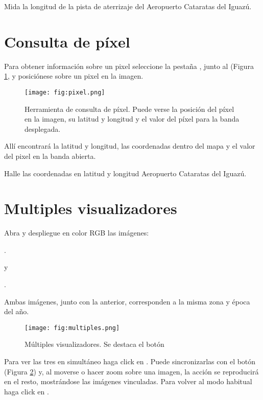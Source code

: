 Mida la longitud de la pista de aterrizaje del Aeropuerto Cataratas del Iguazú.

\section{Consulta de píxel}

Para obtener información sobre un pixel seleccione la pestaña , junto al  (Figura \ref{fig:pixel}, y posiciónese sobre un pixel en la imagen.

\begin{figure}[h!]
    \centering
    \texttt{[image: fig:pixel.png]}
    \caption{Herramienta de consulta de píxel. Puede verse la posición del píxel en la imagen, su latitud y longitud y el valor del píxel para la banda desplegada.}
    \label{fig:pixel}
\end{figure}

Allí encontrará la latitud y longitud, las coordenadas dentro del mapa y el valor del pixel en la banda abierta.

Halle las coordenadas en latitud y longitud Aeropuerto Cataratas del Iguazú.

\section{Multiples visualizadores}

Abra  y despliegue en color RGB las imágenes:
\begin{center} .
\end{center}
y
\begin{center} .
\end{center}

Ambas imágenes, junto con la anterior, corresponden a la misma zona y época del año.

\begin{figure}[h!]
    \centering
    \texttt{[image: fig:multiples.png]}
    \caption{Múltiples visualizadores. Se destaca el botón \\ }
    \label{fig:multiples}
\end{figure}

Para ver las tres en simultáneo haga click en . Puede sincronizarlas con el botón  (Figura \ref{fig:multiples}) y, al moverse o hacer zoom sobre una imagen, la acción se reproducirá en el resto, mostrándose las imágenes vinculadas. Para volver al modo habitual haga click en .



